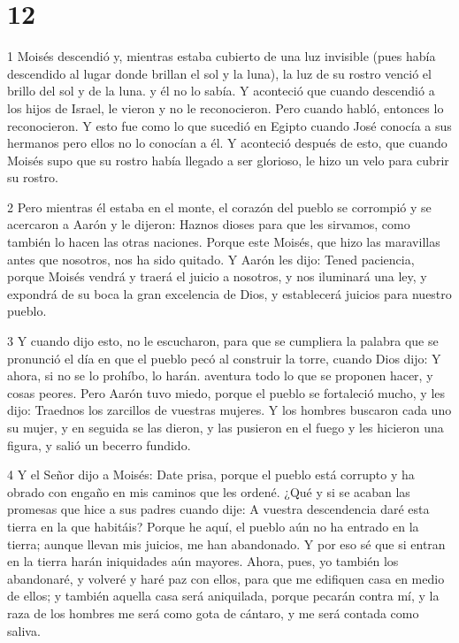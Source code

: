 \chapter{12}

\par 1 Moisés descendió y, mientras estaba cubierto de una luz invisible (pues había descendido al lugar donde brillan el sol y la luna), la luz de su rostro venció el brillo del sol y de la luna. y él no lo sabía. Y aconteció que cuando descendió a los hijos de Israel, le vieron y no le reconocieron. Pero cuando habló, entonces lo reconocieron. Y esto fue como lo que sucedió en Egipto cuando José conocía a sus hermanos pero ellos no lo conocían a él. Y aconteció después de esto, que cuando Moisés supo que su rostro había llegado a ser glorioso, le hizo un velo para cubrir su rostro.

\par 2 Pero mientras él estaba en el monte, el corazón del pueblo se corrompió y se acercaron a Aarón y le dijeron: Haznos dioses para que les sirvamos, como también lo hacen las otras naciones. Porque este Moisés, que hizo las maravillas antes que nosotros, nos ha sido quitado. Y Aarón les dijo: Tened paciencia, porque Moisés vendrá y traerá el juicio a nosotros, y nos iluminará una ley, y expondrá de su boca la gran excelencia de Dios, y establecerá juicios para nuestro pueblo.

\par 3 Y cuando dijo esto, no le escucharon, para que se cumpliera la palabra que se pronunció el día en que el pueblo pecó al construir la torre, cuando Dios dijo: Y ahora, si no se lo prohíbo, lo harán. aventura todo lo que se proponen hacer, y cosas peores. Pero Aarón tuvo miedo, porque el pueblo se fortaleció mucho, y les dijo: Traednos los zarcillos de vuestras mujeres. Y los hombres buscaron cada uno su mujer, y en seguida se las dieron, y las pusieron en el fuego y les hicieron una figura, y salió un becerro fundido.

\par 4 Y el Señor dijo a Moisés: Date prisa, porque el pueblo está corrupto y ha obrado con engaño en mis caminos que les ordené. ¿Qué y si se acaban las promesas que hice a sus padres cuando dije: A vuestra descendencia daré esta tierra en la que habitáis? Porque he aquí, el pueblo aún no ha entrado en la tierra; aunque llevan mis juicios, me han abandonado. Y por eso sé que si entran en la tierra harán iniquidades aún mayores. Ahora, pues, yo también los abandonaré, y volveré y haré paz con ellos, para que me edifiquen casa en medio de ellos; y también aquella casa será aniquilada, porque pecarán contra mí, y la raza de los hombres me será como gota de cántaro, y me será contada como saliva.

